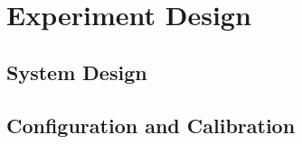 \section{Experiment Design}
\label{Experiment Design}

\subsection{System Design}
\subsection{Configuration and Calibration}
